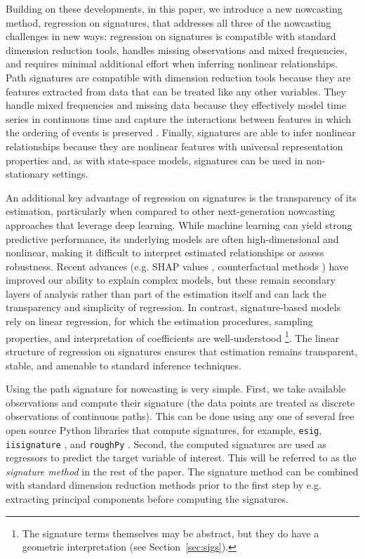 \documentclass[a4paper, 12pt]{article}
\theoremstyle{remark}
\begin{document}
Building on these developments, in this paper, we introduce a new nowcasting method, regression on signatures, that addresses all three of the nowcasting challenges in new ways: regression on signatures is compatible with standard dimension reduction tools, handles missing observations and mixed frequencies, and requires minimal additional effort when inferring nonlinear relationships. Path signatures are compatible with dimension reduction tools because they are features extracted from data that can be treated like any other variables. They handle mixed frequencies and missing data because they effectively model time series in continuous time and capture the interactions between features in which the ordering of events is preserved \citep{gyurko2013extracting, levin2013learning}. Finally, signatures are able to infer nonlinear relationships because they are nonlinear features with universal representation properties \citep{lyons2007differential} and, as with state-space models, signatures can be used in non-stationary settings.

An additional key advantage of regression on signatures is the transparency of its estimation, particularly when compared to other next-generation nowcasting approaches that leverage deep learning. While machine learning can yield strong predictive performance, its underlying models are often high-dimensional and nonlinear, making it difficult to interpret estimated relationships or assess robustness. Recent advances (e.g. SHAP values \citep{lundberg2017unified}, counterfactual methods \citep{black2021consistent}) have improved our ability to explain complex models, but these remain secondary layers of analysis rather than part of the estimation itself and can lack the transparency and simplicity of regression. In contrast, signature-based models rely on linear regression, for which the estimation procedures, sampling properties, and interpretation of coefficients are well-understood \footnote{The signature terms themselves may be abstract, but they do have a geometric interpretation (see Section~\ref{sec:sigs}).}. The linear structure of regression on signatures ensures that estimation remains transparent, stable, and amenable to standard inference techniques.


Using the path signature for nowcasting is very simple. First, we take available observations and compute their signature (the data points are treated as discrete observations of continuous paths). This can be done using any one of several free open source Python libraries that compute signatures, for example, \texttt{esig}, \texttt{iisignature} \citep{iisignature}, and \texttt{roughPy} \citep{morley2024roughpy}. Second, the computed signatures are used as regressors to predict the target variable of interest. This will be referred to as the \textit{signature method} in the rest of the paper. The signature method can be combined with standard dimension reduction methods prior to the first step by e.g. extracting principal components before computing the signatures.
\end{document}
